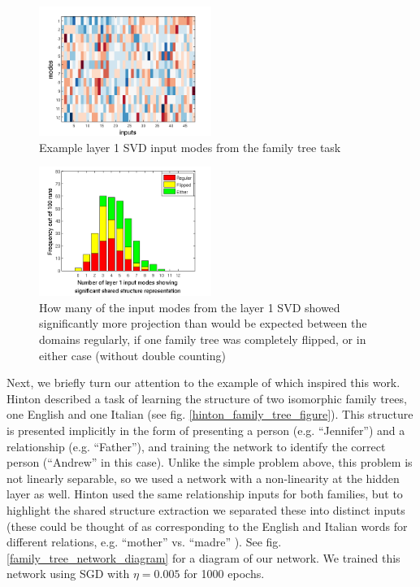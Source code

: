 \documentclass[10pt,letterpaper]{article}
\begin{document}
\begin{figure}
\centering
\includegraphics[width=0.5\textwidth]{figures/ft_input_mode_example.png}
\caption{Example layer 1 SVD input modes from the family tree task}
\label{ft_input_mode_example}
\end{figure}

\begin{figure}
\centering
\includegraphics[width=0.5\textwidth]{figures/ft_input_mode_significance_hist.png}
\caption{How many of the input modes from the layer 1 SVD showed significantly more projection than would be expected between the domains regularly, if one family tree was completely flipped, or in either case (without double counting)}
\label{ft_input_mode_sig_hist}
\end{figure}
Next, we briefly turn our attention to the example of \citet{Hinton1986} which inspired this work. Hinton described a task of learning the structure of two isomorphic family trees, one English and one Italian (see fig. \ref{hinton_family_tree_figure}). This structure is presented implicitly in the form of presenting a person (e.g. ``Jennifer'') and a relationship (e.g. ``Father''), and training the network to identify the correct person (``Andrew'' in this case). Unlike the simple problem above, this problem is not linearly separable, so we used a network with a non-linearity at the hidden layer as well. Hinton used the same relationship inputs for both families, but to highlight the shared structure extraction we separated these into distinct inputs (these could be thought of as corresponding to the English and Italian words for different relations, e.g. ``mother'' vs. ``madre'' ). See fig. \ref{family_tree_network_diagram} for a diagram of our network. We trained this network using SGD with \(\eta = 0.005\) for 1000 epochs. \par 
\end{document}
